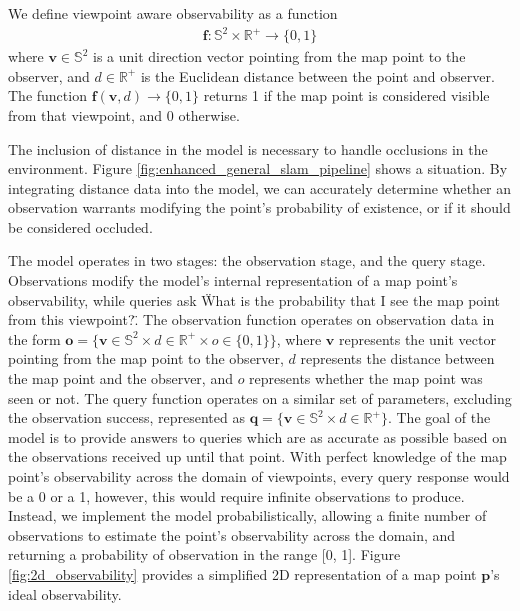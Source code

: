 We define viewpoint aware observability as a function
\begin{align*}
    \boldsymbol{f:}\mathbb{S}^2\times\mathbb{R}^+\rightarrow\{0,1\}
\end{align*}
where $\mathbf{v}\in\mathbb{S}^2$ is a unit direction vector pointing from the map point to the observer, and $d\in\mathbb{R}^+$ is the Euclidean distance between the point and observer. The function $\boldsymbol{f}(\mathbf{v}, d)\rightarrow\{0,1\}$ returns 1 if the map point is considered visible from that viewpoint, and 0 otherwise.


The inclusion of distance in the model is necessary to handle occlusions in the environment. Figure \ref{fig:enhanced_general_slam_pipeline} shows a situation. By integrating distance data into the model, we can accurately determine whether an observation warrants modifying the point's probability of existence, or if it should be considered occluded.


The model operates in two stages: the observation stage, and the query stage. Observations modify the model's internal representation of a map point's observability, while queries ask \"What is the probability that I see the map point from this viewpoint?\". The observation function operates on observation data in the form $\boldsymbol{o} = \{\boldsymbol{v}\in\mathbb{S}^2\times d\in\mathbb{R}^+\times o\in\{0, 1\}\}$, where $\boldsymbol{v}$ represents the unit vector pointing from the map point to the observer, $d$ represents the distance between the map point and the observer, and $o$ represents whether the map point was seen or not. The query function operates on a similar set of parameters, excluding the observation success, represented as $\boldsymbol{q} = \{\boldsymbol{v}\in\mathbb{S}^2\times d\in\mathbb{R}^+\}$. The goal of the model is to provide answers to queries which are as accurate as possible based on the observations received up until that point. With perfect knowledge of the map point's observability across the domain of viewpoints, every query response would be a 0 or a 1, however, this would require infinite observations to produce. Instead, we implement the model probabilistically, allowing a finite number of observations to estimate the point's observability across the domain, and returning a probability of observation in the range [0, 1]. Figure \ref{fig:2d_observability} provides a simplified 2D representation of a map point $\boldsymbol{p}$'s ideal observability.




